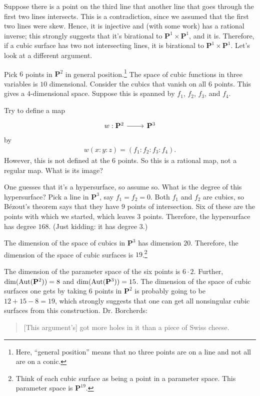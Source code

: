 \documentclass [11 pt, oneside] {article}
\begin{document}
Suppose there is a point on the third line that another line that goes through the first two lines intersects. This is a contradiction, since we assumed that the first two lines were skew. Hence, it is injective and (with some work) has a rational inverse; this strongly suggests that it's birational to $ \mathbf{P}^1\times \mathbf{P}^1$, and it is. Therefore, if a cubic surface has two not intersecting lines, it is birational to $\mathbf{P}^1\times \mathbf{P}^1$. Let's look at a different argument.

Pick $6$ points in $\mathbf{P}^2$ in general position.\footnote{Here, ``general position'' means that no three points are on a line and not all are on a conic.} The space of cubic functions in three variables is $10$ dimensional. Consider the cubics that vanish on all $6$ points. This gives a $4$-dimensional space. Suppose this is spanned by $f_1$, $f_2$, $f_3$, and $f_4$.

Try to define a map 
\[
\begin{tikzcd}
w : \mathbf{P}^2 \ar[r]& \mathbf{P}^3
\end{tikzcd}
\] 
by 
\begin{align*}
	w(x:y:z)=  (f_1:f_2:f_3:f_4).
\end{align*}
However, this is not defined at the $6$ points. So this is a rational map, not a regular map. What is its image?

One guesses that it's a hypersurface, so assume so. What is the degree of this hypersurface? Pick a line in $\mathbf{P}^3$, say $f_1=f_2=0$. Both $f_1$ and $f_2$ are cubics, so B\'ezout's theorem says that they have $9$ points of intersection. Six of these are the points with which we started, which leaves $3$ points. Therefore, the hypersurface has degree $168$. (Just kidding: it has degree $3$.)

The dimension of the space of cubics in $\mathbf{P}^3$ has dimension $20$. Therefore, the dimension of the space of cubic surfaces is $19$.\footnote{Think of each cubic surface as being a point in a parameter space. This parameter space is $\mathbf{P}^{19}$.}

The dimension of the parameter space of the six points is $6\cdot 2$. Further, $\dim (\operatorname{Aut}(\mathbf{P}^2))=8$ and $\dim(\operatorname{Aut}(\mathbf{P}^3)) =15$. The dimension of the space of cubic surfaces one gets by taking $6$ points in $\mathbf{P}^2$ is probably going to be $12+15-8=19$, which strongly suggests that one can get all nonsingular cubic surfaces from this construction. Dr. Borcherds:
\begin{quote}
	\small 
	[This argument's] got more holes in it than a piece of Swiss cheese.
\end{quote}
\end{document}
